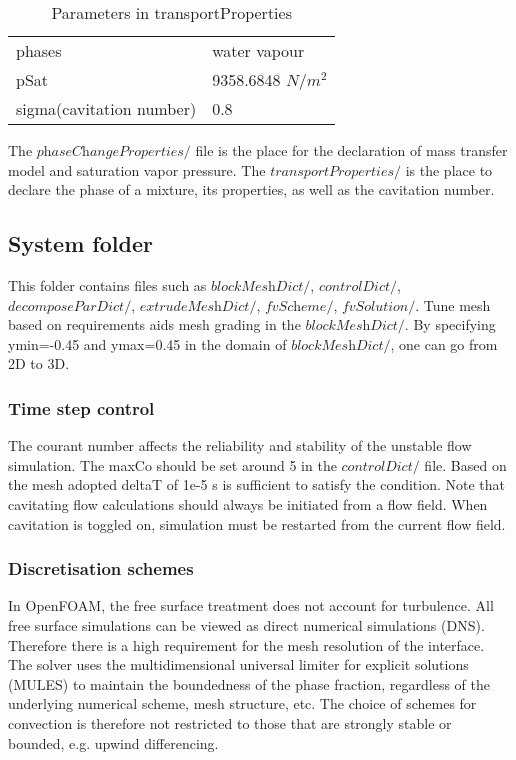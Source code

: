 \begin{table}[h]
\centering
\begin{tabular}{|ll|}
\hline
\rowcolor{gray!20}\multicolumn{2}{|l|}{transportProperties}    \\ \hline
\multicolumn{1}{|l|}{phases} &water vapour  \\ \hline
\multicolumn{1}{|l|}{pSat} & 9358.6848 $N/{m^2}$\\ \hline
\multicolumn{1}{|l|}{sigma(cavitation number) } & 0.8 \\ \hline
\end{tabular}
\caption{Parameters in transportProperties}
\label{tab:PC}
\end{table}












The $\textit{phaseChangeProperties/}$ file is the place for the declaration of mass transfer model and saturation vapor pressure. The
$\textit{transportProperties}/$ is the place to declare the phase of a mixture, its properties, as well as the cavitation number.
\subsection{System folder}
This folder contains files such as  $\textit{blockMeshDict}/$, $\textit{controlDict}/$, $\textit{decomposeParDict}/$, 
$\textit{extrudeMeshDict}/$, $\textit{fvScheme}/$, $\textit{fvSolution}/$. Tune mesh based on requirements aids mesh grading in the $\textit{blockMeshDict}/$.
By specifying ymin=-0.45 and ymax=0.45 in the domain of  $\textit{blockMeshDict}/$, one can go from 2D to 3D.   \\
\subsubsection{Time step control}
The courant number affects the reliability and stability of the unstable flow simulation. The maxCo should 
be set around 5 in the $\textit{controlDict}/$ file. Based on the mesh adopted deltaT of 1e-5 s is sufficient to satisfy the condition. Note that cavitating flow calculations 
should always be initiated from a flow field. When cavitation is toggled on, simulation must be restarted from the 
current flow field.\\
\subsubsection{Discretisation schemes}
In OpenFOAM, the free surface treatment does not account for turbulence. All free surface simulations can be viewed 
as direct numerical simulations (DNS). Therefore there is a high requirement for the mesh resolution of the interface. 
The solver uses the multidimensional universal limiter for explicit solutions (MULES) to maintain the boundedness of 
the phase fraction, regardless of the underlying numerical scheme, mesh structure, etc. The choice of schemes for 
convection is therefore not restricted to those that are strongly stable or bounded, e.g. upwind differencing.\\
